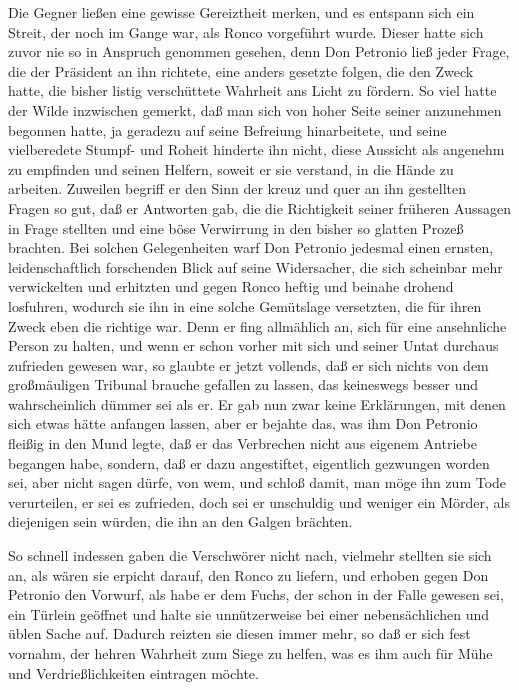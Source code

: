 Die Gegner ließen eine gewisse Gereiztheit merken, und es entspann
sich ein Streit, der noch im Gange war, als Ronco vorgeführt wurde.
Dieser hatte sich zuvor nie so in Anspruch genommen gesehen, denn
Don Petronio ließ jeder Frage, die der Präsident an ihn richtete,
eine anders gesetzte folgen, die den Zweck hatte, die bisher listig
verschüttete Wahrheit ans Licht zu fördern. So viel hatte der Wilde
inzwischen gemerkt, daß man sich von hoher Seite seiner anzunehmen
begonnen hatte, ja geradezu auf seine Befreiung hinarbeitete, und
seine vielberedete Stumpf- und Roheit hinderte ihn nicht, diese
Aussicht als angenehm zu empfinden \pagenum{[78]} und seinen
Helfern, soweit er sie verstand, in die Hände zu arbeiten. Zuweilen
begriff er den Sinn der kreuz und quer an ihn gestellten Fragen so
gut, daß er Antworten gab, die die Richtigkeit seiner früheren
Aussagen in Frage stellten und eine böse Verwirrung in den bisher
so glatten Prozeß brachten. Bei solchen Gelegenheiten warf Don
Petronio jedesmal einen ernsten, leidenschaftlich forschenden Blick
auf seine Widersacher, die sich scheinbar mehr verwickelten und
erhitzten und gegen Ronco heftig und beinahe drohend losfuhren,
wodurch sie ihn in eine solche Gemütslage versetzten, die für ihren
Zweck eben die richtige war. Denn er fing allmählich an, sich für
eine ansehnliche Person zu halten, und wenn er schon vorher mit
sich und seiner Untat durchaus zufrieden gewesen war, so glaubte er
jetzt vollends, daß er sich nichts von dem großmäuligen Tribunal
brauche gefallen zu lassen, das keineswegs besser und
wahrscheinlich dümmer sei als er. Er gab nun zwar keine
Erklärungen, mit denen sich etwas hätte anfangen lassen, aber er
bejahte das, was ihm Don Petronio fleißig in den Mund legte, daß er
das Verbrechen nicht aus eigenem Antriebe begangen habe, sondern,
daß er dazu angestiftet, eigentlich gezwungen worden sei, aber
nicht sagen dürfe, von wem, und schloß damit, man möge ihn zum Tode
verurteilen, er sei es zufrieden, doch sei er unschuldig und
weniger ein Mörder, als diejenigen sein würden, die ihn an den
Galgen brächten.

So schnell indessen gaben die Verschwörer nicht nach, vielmehr
stellten sie sich an, als wären sie erpicht darauf, den Ronco zu
liefern, und erhoben gegen Don Petronio den Vorwurf, als habe er
dem Fuchs, der schon in der Falle gewesen sei, ein Türlein geöffnet
und halte sie unnützerweise bei einer nebensächlichen und üblen
Sache auf. \pagenum{[79]} Dadurch reizten sie diesen immer mehr, so
daß er sich fest vornahm, der hehren Wahrheit zum Siege zu helfen,
was es ihm auch für Mühe und Verdrießlichkeiten eintragen möchte.

